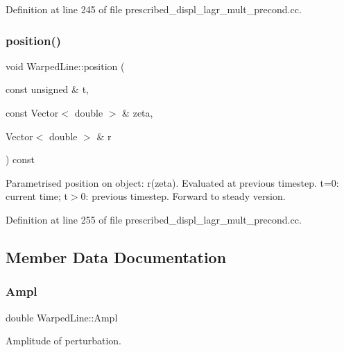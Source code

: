 Definition at line 245 of file prescribed\+\_\+displ\+\_\+lagr\+\_\+mult\+\_\+precond.\+cc.

\mbox{\label{classWarpedLine_a415d50f6bb49bd903015b51c66e93cd2}} 
\subsubsection{\texorpdfstring{position()}{position()}\hspace{0.1cm}{\footnotesize\ttfamily [6/6]}}
{\footnotesize\ttfamily void Warped\+Line\+::position (\begin{DoxyParamCaption}\item[{const unsigned \&}]{t,  }\item[{const Vector$<$ double $>$ \&}]{zeta,  }\item[{Vector$<$ double $>$ \&}]{r }\end{DoxyParamCaption}) const\hspace{0.3cm}{\ttfamily [inline]}}



Parametrised position on object\+: r(zeta). Evaluated at previous timestep. t=0\+: current time; t$>$0\+: previous timestep. Forward to steady version. 



Definition at line 255 of file prescribed\+\_\+displ\+\_\+lagr\+\_\+mult\+\_\+precond.\+cc.



\subsection{Member Data Documentation}
\mbox{\label{classWarpedLine_ac44286e84ff213e67e0f247d00ad50af}} 
\subsubsection{\texorpdfstring{Ampl}{Ampl}}
{\footnotesize\ttfamily double Warped\+Line\+::\+Ampl\hspace{0.3cm}{\ttfamily [private]}}



Amplitude of perturbation. 



